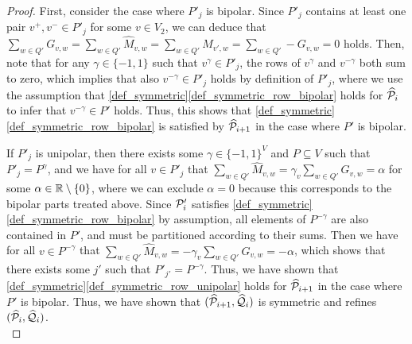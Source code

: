 \documentclass[pdflatex,sn-mathphys-num]{sn-jnl}%
\theoremstyle{thmstyleone}%
\theoremstyle{thmstylethree}%
\theoremstyle{thmstyletwo}%
\begin{document}
\begin{proof}
        First, consider the case where $P'_j$ is bipolar. Since $P'_j$ contains at least one pair $v^+,v^-\in P'_j$ for some $v\in V_2$, we can deduce that $\sum_{w\in Q'} G_{v,w} = \sum_{w\in Q'} \widehat{M}_{v,w} = \sum_{w\in Q'} \widehat{M}_{v',w} = \sum_{w\in Q'} -G_{v,w} = 0$ holds. Then, note that for any $\gamma\in \{-1,1\}$ such that $v^\gamma \in P'_j$, the rows of $v^\gamma$ and $v^{-\gamma}$ both sum to zero, which implies that also $v^{-\gamma}\in P'_j$ holds by definition of $P'_j$, where we use the assumption that \cref{def_symmetric}\ref{def_symmetric_row_bipolar} holds for $\widehat{\mathcal{P}}_i$ to infer that $v^{-\gamma} \in P'$ holds. Thus, this shows that \cref{def_symmetric}\ref{def_symmetric_row_bipolar} is satisfied by $\widehat{\mathcal{P}}_{i+1}$ in the case where $P'$ is bipolar. 

        If $P'_j$ is unipolar, then there exists some $\gamma\in \{-1,1\}^V$ and $P\subseteq V$ such that $P'_j = P^\gamma$, and we have for all $v\in P'_j$ that $\sum_{w\in Q'} \widehat{M}_{v,w} = \gamma_v \sum_{w\in Q'} G_{v,w} = \alpha $ for some $\alpha \in \mathbb{R}\setminus\{0\}$, where we can exclude $\alpha = 0$ because this corresponds to the bipolar parts treated above. Since $\mathcal{P}_i'$ satisfies \cref{def_symmetric}\ref{def_symmetric_row_bipolar} by assumption, all elements of $P^{-\gamma}$ are also contained in $P'$, and must be partitioned according to their sums. Then we have for all $v\in P^{-\gamma}$ that $\sum_{w\in Q'} \widehat{M}_{v,w} = -\gamma_v \sum_{w\in Q'} G_{v,w} = -\alpha$, which shows that there exists some $j'$ such that $P'_{j'} = P^{-\gamma}$. Thus, we have shown that \cref{def_symmetric}\ref{def_symmetric_row_unipolar} holds for $\widehat{\mathcal{P}}_{i+1}$ in the case where $P'$ is bipolar. Thus, we have shown that $(\widehat{\mathcal{P}}_{i+1}, \widehat{\mathcal{Q}}_i)$ is symmetric and refines $(\widehat{\mathcal{P}}_i,\widehat{\mathcal{Q}}_i)$.\\
        

\end{proof}
\end{document}
